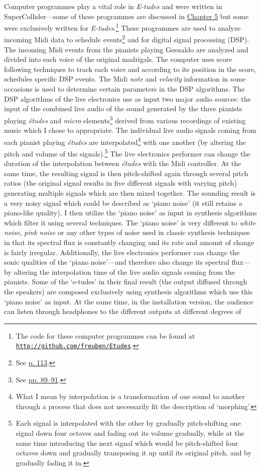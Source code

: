 Computer programmes play a vital role in \emph{E-tudes} and were written in SuperCollider---some of these programmes are discussed in \hyperlink{chapter5}{Chapter 5} but some were exclusively written for \emph{E-tudes}.\footnote{The code for these computer programmes can be found at \href{http://github.com/freuben/Etudes}{\texttt {http://github.com/freuben/Etudes}}.} These programmes are used to analyze incoming Midi data to schedule events\footnote{See \hyperlink{miditrig}{p. 113}.} and for digital signal processing (DSP). The incoming Midi events from the pianists playing Gesualdo are analyzed and divided into each voice of the original madrigals. The computer uses score following techniques to track each voice and according to its position in the score, schedules specific DSP events. The Midi \emph{note} and \emph{velocity} information in some occasions is used to determine certain parameters in the DSP algorithms. The DSP algorithms of the live electronics use as input two major audio sources: the input of the combined live audio of the sound generated by the three pianists playing \emph{\'{e}tudes} and \emph{micro} elements\footnote{See \hyperlink{macroplunder}{pp. 89--91}.} derived from various recordings of existing music which I chose to appropriate. The individual live audio signals coming from each pianist playing \emph{\'{e}tudes} are interpolated\footnote{What I mean by interpolation is a transformation of one sound to another through a process that does not necessarily fit the description of `morphing'.} with one another (by altering the pitch and volume of the signals).\footnote{Each signal is interpolated with the other by gradually pitch-shifting one signal down four octaves and fading out its volume gradually, while at the same time introducing the next signal which would be pitch-shifted four octaves down and gradually transposing it up until its original pitch, and by gradually fading it in.} The live electronics performer can change the duration of the interpolation between \emph{\'{e}tudes} with the Midi controller. At the same time, the resulting signal is then pitch-shifted again through several pitch ratios (the original signal results in five different signals with varying pitch) generating multiple signals which are then mixed together. The sounding result is a very noisy signal which could be described as `piano noise' (it still retains a piano-like quality). I then utilize the `piano noise' as input in synthesis algorithms which filter it using several techniques. The `piano noise' is very different to \emph{white noise}, \emph{pink noise} or any other types of noise used in classic synthesis techniques in that its spectral flux is constantly changing and its rate and amount of change is fairly irregular. Additionally, the live electronics performer can change the sonic qualities of the `piano noise'---and therefore also change its spectral flux---by altering the interpolation time of the live audio signals coming from the pianists. Some of the `e-tudes' in their final result (the output diffused through the speakers) are composed exclusively using synthesis algorithms which use this `piano noise' as input. At the same time, in the installation version, the audience can listen through headphones to the different outputs at different degrees of 